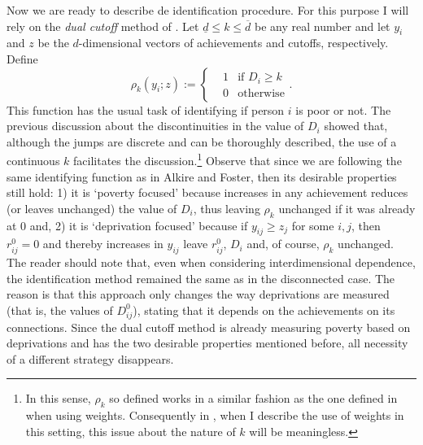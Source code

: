 \documentclass[english, a4paper,12pt]{article}
\begin{document}
Now we are ready to describe de identification procedure. For this purpose I will rely on the \textit{dual cutoff} method of \cite{AlkireFoster11}. Let $\underline{d} \leq k \leq \overline{d}$ be any real number and let $y_{i}$ and $z$ be the $d$-dimensional vectors of achievements and cutoffs, respectively. Define
	$$
		\rho_{k}(y_{i}; z)
			:=	\left\{ \begin{aligned}
						&1	&\text{if } D_{i} \geq k	\\
						&0	&\text{otherwise}
					\end{aligned} \right. .
	$$
This function has the usual task of identifying if person $i$ is poor or not. The previous discussion about the discontinuities in the value of $D_{i}$ showed that, although the jumps are discrete and can be thoroughly described, the use of a continuous $k$ facilitates the discussion.\footnote{In this sense, $\rho_{k}$ so defined works in a similar fashion as the one defined in \cite{AlkireFoster11} when using weights. Consequently in , when I describe the use of weights in this setting, this issue about the nature of $k$ will be meaningless.} Observe that since we are following the same identifying function as in Alkire and Foster, then its desirable properties still hold: 1) it is `poverty focused' because increases in any achievement reduces (or leaves unchanged) the value of $D_{i}$, thus leaving $\rho_{k}$ unchanged if it was already at 0 and, 2) it is `deprivation focused' because if $y_{ij} \geq z_{j}$ for some $i,j$, then $r_{ij}^{0} = 0$ and thereby increases in $y_{ij}$ leave $r_{ij}^{0}$, $D_{i}$ and, of course, $\rho_{k}$ unchanged. The reader should note that, even when considering interdimensional dependence, the identification method remained the same as in the disconnected case. The reason is that this approach only changes the way deprivations are measured (that is, the values of $D_{ij}^{0}$), stating that it depends on the achievements on its connections. Since the dual cutoff method is already measuring poverty based on deprivations and has the two desirable properties mentioned before, all necessity of a different strategy disappears. 
\end{document}
